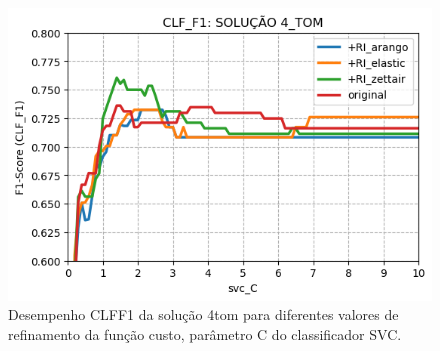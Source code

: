 \begin{figure}[ht]
    \centering
    \caption{Desempenho CLF\underscore{}F1 da solução 4\underscore{}tom para diferentes valores de refinamento da função custo, parâmetro C do classificador SVC.}
    \vspace{-0.5cm}
    \begin{center}
        \includegraphics[scale=0.75]{img/clf-f1-4-tom.png}
    \end{center}
    \vspace{-0.5cm}
    \label{fig:clf-f1-4-tom}
\end{figure}